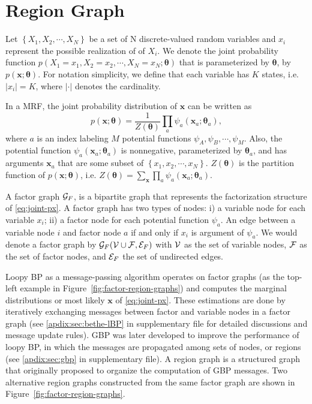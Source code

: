 \section{Region Graph}

Let $\left\{X_1, X_2, \cdots, X_N\right\}$ be a set of N discrete-valued random variables and $x_i$ represent the possible realization of of $X_i$. We denote the joint probability function $p(X_1=x_1, X_2=x_2, \cdots, X_N=x_N; \bm{\theta})$ that is parameterized by $\bm{\theta}$, by $p(\bm{x}; \bm{\theta})$. For notation simplicity, we define that each variable has $K$ states, i.e. $|x_i|=K$, where $|\cdot|$ denotes the cardinality.


In a MRF, the joint probability distribution of $\bm{x}$ can be written as
\begin{equation}\label{eq:joint-px}
  p(\bm{x}; \bm{\theta}) = \frac{1}{Z(\bm{\theta})} \prod_{a} \psi_a(\bm{x}_a; \bm{\theta}_a),
\end{equation}
where $a$ is an index labeling $M$ potential functions $\psi_A, \psi_B, \cdots, \psi_M$. Also, the potential function $\psi_a(\bm{x}_a;\bm{\theta}_a)$ is nonnegative, parameterized by $\bm{\theta}_a$, and has arguments $\bm{x}_a$ that are some subset of $\left\{ x_1, x_2, \cdots, x_N \right\}$. $Z(\bm{\theta})$ is the partition function of $p(\bm{x}; \bm{\theta})$, i.e. $Z(\bm{\theta}) = \sum_{\bm{x}}\prod_{a} \psi_a(\bm{x}_a;\bm{\theta}_a)$.

\begin{definition}\label{def:factor-graph}
A factor graph $\mathcal{G}_F$, is a bipartite graph that represents the factorization structure of \eqref{eq:joint-px}. A factor graph has two types of nodes: i) a variable node for each variable $x_i$; ii) a factor node for each potential function $\psi_a$. An edge between a variable node $i$ and factor node $a$ if and only if $x_i$ is argument of $\psi_a$. We would denote a factor graph by $\mathcal{G}_F(\mathcal{V} \cup \mathcal{F}, \mathcal{E}_F)$ with $\mathcal{V}$ as the set of variable nodes, $\mathcal{F}$ as the set of factor nodes, and $\mathcal{E}_F$ the set of undirected edges.
\end{definition}

Loopy BP as a message-passing algorithm operates on factor graphs (as the top-left example in Figure~\ref{fig:factor-region-graphs}) and computes the marginal distributions or most likely $\bm{x}$ of \eqref{eq:joint-px}. These estimations are done by iteratively exchanging messages between factor and variable nodes in a factor graph ({see \ref{apdix:sec:bethe-lBP} in supplementary file for detailed discussions and message update rules}). GBP was later developed to improve the performance of loopy BP, in which the messages are propagated among sets of nodes, or regions (see \ref{apdix:sec:gbp} in supplementary file). A region graph is a structured graph that originally proposed to organize the computation of GBP messages. Two alternative region graphs constructed from the same factor graph are shown in Figure~\ref{fig:factor-region-graphs}.

